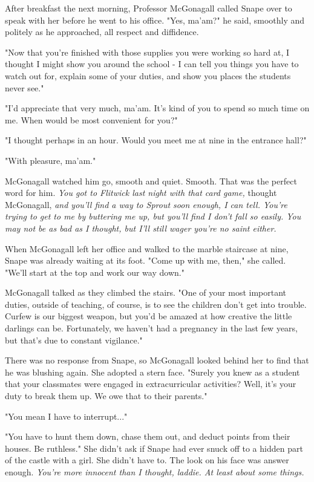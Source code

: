 After breakfast the next morning, Professor McGonagall called Snape over to speak with her before he went to his office. "Yes, ma'am?" he said, smoothly and politely as he approached, all respect and diffidence.

"Now that you're finished with those supplies you were working so hard at, I thought I might show you around the school - I can tell you things you have to watch out for, explain some of your duties, and show you places the students never see."

"I'd appreciate that very much, ma'am. It's kind of you to spend so much time on me. When would be most convenient for you?"

"I thought perhaps in an hour. Would you meet me at nine in the entrance hall?"

"With pleasure, ma'am."

McGonagall watched him go, smooth and quiet. Smooth. That was the perfect word for him. \emph{You got to Flitwick last night with that card game,} thought McGonagall, \emph{and you'll find a way to Sprout soon enough, I can tell. You're trying to get to me by buttering me up, but you'll find I don't fall so easily. You may not be as bad as I thought, but I'll still wager you're no saint either.}

When McGonagall left her office and walked to the marble staircase at nine, Snape was already waiting at its foot. "Come up with me, then," she called. "We'll start at the top and work our way down."

McGonagall talked as they climbed the stairs. "One of your most important duties, outside of teaching, of course, is to see the children don't get into trouble. Curfew is our biggest weapon, but you'd be amazed at how creative the little darlings can be. Fortunately, we haven't had a pregnancy in the last few years, but that's due to constant vigilance."

There was no response from Snape, so McGonagall looked behind her to find that he was blushing again. She adopted a stern face. "Surely you knew as a student that your classmates were engaged in extracurricular activities? Well, it's your duty to break them up. We owe that to their parents."

"You mean I have to interrupt..."

"You have to hunt them down, chase them out, and deduct points from their houses. Be ruthless." She didn't ask if Snape had ever snuck off to a hidden part of the castle with a girl. She didn't have to. The look on his face was answer enough. \emph{You're more innocent than I thought, laddie. At least about some things.}

